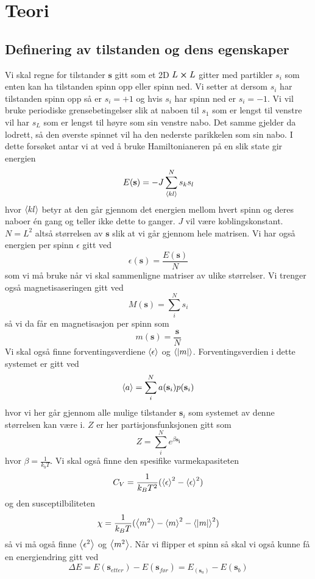 \documentclass[reprint,english,notitlepage]{revtex4-2}  %
\begin{document}
\section{Teori}
\subsection{Definering av tilstanden og dens egenskaper}
Vi skal regne for tilstander $\mathbf{s}$ gitt som et 2D $L\cross L$ gitter med partikler $s_i$ som enten kan ha tilstanden spinn opp eller spinn ned. Vi setter at dersom $s_i$ har tilstanden spinn opp så er $s_i=+1$ og hvis $s_i$ har spinn ned er $s_i=-1$. Vi vil bruke periodiske grensebetingelser slik at naboen til $s_1$ som er lengst til venstre vil har $s_L$ som er lengst til høyre som sin venstre nabo. Det samme gjelder da lodrett, så den øverste spinnet vil ha den nederste parikkelen som sin nabo. I dette forsøket antar vi at ved å bruke Hamiltonianeren på en slik state gir energien
$$
E(\mathbf{s})=-J\sum_{\expval{kl}}^{N} s_k s_l
$$
hvor $\expval{kl}$ betyr at den går gjennom det energien mellom hvert spinn og deres naboer én gang og teller ikke dette to ganger. $J$ vil være koblingskonstant. $N=L^2$ altså størrelsen av $\mathbf{s}$ slik at vi går gjennom hele matrisen.
\newline Vi har også energien per spinn $\epsilon$ gitt ved 
$$
\epsilon(\mathbf{s}) =\frac{E(\mathbf{s})}{N}
$$
som vi må bruke når vi skal sammenligne matriser av ulike størrelser.
\newline Vi trenger også magnetisaseringen gitt ved
$$
M(\mathbf{s})=\sum_i^N s_i
$$
så vi da får en magnetisasjon per spinn som
$$
m(\mathbf{s})=\frac{\mathbf{s}}{N}
$$
Vi skal også finne forventingsverdiene $\expval{\epsilon}$ og $\expval{|m|}$. Forventingsverdien i dette systemet er gitt ved
$$
\expval{a}=\sum _i^{N}a(\mathbf{s}_i) p(\mathbf{s}_i)
$$
hvor vi her går gjennom alle mulige tilstander $\mathbf{s}_i$ som systemet av denne størrelsen kan være i. $Z$ er her partisjonsfunksjonen gitt som
$$
Z=\sum_{i}^{N}e^{\beta \mathbf{s_i}}
$$
hvor $\beta=\frac{1}{k_bT}$. \newline  Vi skal også finne den spesifike varmekapasiteten
$$
C_V=\frac{1}{k_B T^2}(\expval{\epsilon}^2-\expval{\epsilon}^2)
$$
og den susceptilbiliteten
$$
\chi =\frac{1}{k_B T}(\expval{m^2}-\expval{m}^2-\expval{|m|}^2)
$$
så vi må også finne $\expval{\epsilon^2}$ og $\expval{m^2}$. \newline
Når vi flipper et spinn så skal vi også kunne få en energiendring gitt ved
$$
\Delta E=E(\mathbf{s}_{etter})-E(\mathbf{s}_{før})=E_(\mathbf{s}_a)-E(\mathbf{s}_b)
$$
\end{document}
